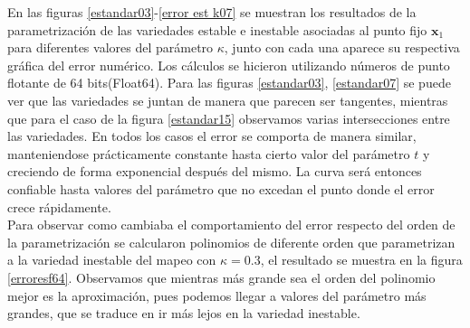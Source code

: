 En las figuras \ref{estandar03}-\ref{error est k07} se muestran los resultados de la parametrización de las variedades estable e inestable asociadas al punto fijo $\mathbf{x}_{1}$ para diferentes valores del parámetro $\kappa$, junto con cada una aparece su respectiva gráfica del error numérico.   Los cálculos se hicieron utilizando números de punto flotante de 64 bits(Float64). Para las figuras \ref{estandar03}, \ref{estandar07} se puede ver que las variedades se juntan de manera que parecen ser tangentes, mientras que para el caso de la figura \ref{estandar15} observamos varias intersecciones entre las variedades. En todos los casos el error se comporta de manera similar, manteniendose prácticamente constante hasta cierto valor del parámetro $t$ y creciendo de forma exponencial después del mismo. La curva será entonces confiable hasta valores del parámetro que no excedan el punto donde el error crece rápidamente.  \\


Para observar como cambiaba el comportamiento del error respecto del orden de la parametrización se calcularon polinomios de diferente orden que parametrizan a la variedad inestable del mapeo con $\kappa=0.3$, el resultado se muestra en la figura \ref{erroresf64}. Observamos que mientras más grande sea el orden del polinomio mejor es la aproximación, pues podemos llegar a valores del parámetro más grandes, que se traduce en ir más lejos en la variedad inestable. \\

